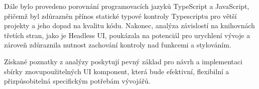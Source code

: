 Dále bylo provedeno porovnání programovacích jazyků TypeScript a JavaScript, přičemž byl zdůrazněn přínos statické typové kontroly Typescriptu pro větší projekty a jeho dopad na kvalitu kódu. Nakonec, analýza závislostí na knihovnách třetích stran, jako je Headless UI, poukázala na potenciál pro urychlení vývoje a zároveň zdůraznila nutnost zachování kontroly nad funkcemi a stylováním.

Získané poznatky z analýzy poskytují pevný základ pro návrh a implementaci sbírky znovupoužitelných UI komponent, která bude efektivní, flexibilní a přizpůsobitelná specifickým potřebám vývojářů.

